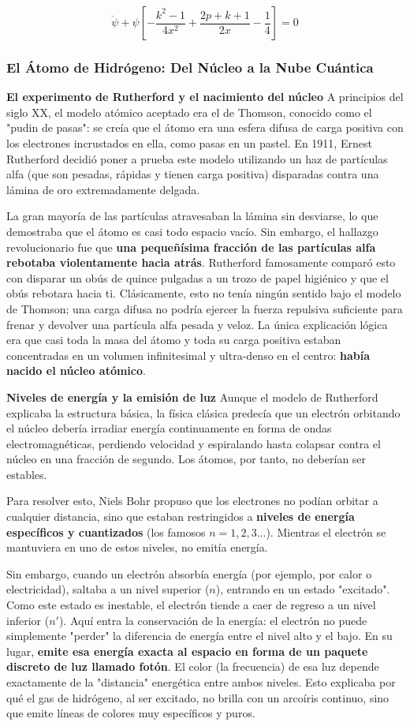 \documentclass[a4paper]{article}
\begin{document}
\[
\ddot{\psi} + \psi \left[ -\frac{k^2-1}{4x^2} + \frac{2p+k+1}{2x} - \frac{1}{4} \right] = 0
\]

\subsubsection{El Átomo de Hidrógeno: Del Núcleo a la Nube Cuántica}

\textbf{El experimento de Rutherford y el nacimiento del núcleo}
A principios del siglo XX, el modelo atómico aceptado era el de Thomson, conocido como el "pudin de pasas": se creía que el átomo era una esfera difusa de carga positiva con los electrones incrustados en ella, como pasas en un pastel. En 1911, Ernest Rutherford decidió poner a prueba este modelo utilizando un haz de partículas alfa (que son pesadas, rápidas y tienen carga positiva) disparadas contra una lámina de oro extremadamente delgada. 

La gran mayoría de las partículas atravesaban la lámina sin desviarse, lo que demostraba que el átomo es casi todo espacio vacío. Sin embargo, el hallazgo revolucionario fue que \textbf{una pequeñísima fracción de las partículas alfa rebotaba violentamente hacia atrás}. Rutherford famosamente comparó esto con disparar un obús de quince pulgadas a un trozo de papel higiénico y que el obús rebotara hacia ti. Clásicamente, esto no tenía ningún sentido bajo el modelo de Thomson; una carga difusa no podría ejercer la fuerza repulsiva suficiente para frenar y devolver una partícula alfa pesada y veloz. La única explicación lógica era que casi toda la masa del átomo y toda su carga positiva estaban concentradas en un volumen infinitesimal y ultra-denso en el centro: \textbf{había nacido el núcleo atómico}.

\textbf{Niveles de energía y la emisión de luz}
Aunque el modelo de Rutherford explicaba la estructura básica, la física clásica predecía que un electrón orbitando el núcleo debería irradiar energía continuamente en forma de ondas electromagnéticas, perdiendo velocidad y espiralando hasta colapsar contra el núcleo en una fracción de segundo. Los átomos, por tanto, no deberían ser estables. 

Para resolver esto, Niels Bohr propuso que los electrones no podían orbitar a cualquier distancia, sino que estaban restringidos a \textbf{niveles de energía específicos y cuantizados} (los famosos $n=1, 2, 3...$). Mientras el electrón se mantuviera en uno de estos niveles, no emitía energía. 

Sin embargo, cuando un electrón absorbía energía (por ejemplo, por calor o electricidad), saltaba a un nivel superior ($n$), entrando en un estado "excitado". Como este estado es inestable, el electrón tiende a caer de regreso a un nivel inferior ($n'$). Aquí entra la conservación de la energía: el electrón no puede simplemente "perder" la diferencia de energía entre el nivel alto y el bajo. En su lugar, \textbf{emite esa energía exacta al espacio en forma de un paquete discreto de luz llamado fotón}. El color (la frecuencia) de esa luz depende exactamente de la "distancia" energética entre ambos niveles. Esto explicaba por qué el gas de hidrógeno, al ser excitado, no brilla con un arcoíris continuo, sino que emite líneas de colores muy específicos y puros.
\end{document}
